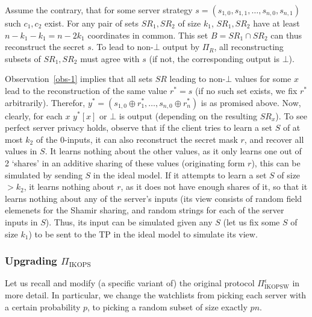 \documentclass[a4paper]{article}
\begin{document}
Assume the contrary, that for some server strategy $s=(s_{1,0},s_{1,1},\ldots,s_{n,0},s_{n,1})$ such $c_1,c_2$ exist.
For any pair of sets $SR_1,SR_2$ of size $k_1$, $SR_1,SR_2$ have at least $n-k_1-k_1=n-2k_1$ coordinates in common. This set $B=SR_1\cap SR_2$ can thus reconstruct the secret $s$. To lead to non-$\bot$ output by $\Pi_R$, all reconstructing subsets of $SR_1,SR_2$ must agree with $s$ (if not, the corresponding output is $\bot$).


Observation~\ref{obs-1} implies that all sets $SR$ leading to non-$\bot$ values for some $x$ lead to the reconstruction of the same value $r^*=s$ (if no such set exists, we fix $r^*$ arbitrarily). Therefor, $y^*=(s_{1,0}\oplus r^*_1,\ldots,s_{n,0}\oplus r^*_n)$ is as promised above. Now, clearly, for each $x$ $y^*[x]$ or $\bot$ is output (depending on the resulting $SR_x$). To see perfect server privacy holds, observe that if the client tries to learn a set $S$ of at most $k_2$ of the 0-inputs, it can also reconstruct the secret mask $r$, and recover all values in $S$.
It learns nothing about the other values, as it only learns one out of 2 `shares' in an additive sharing of these values (originating form $r$), this can be simulated by sending $S$ in the ideal model.
If it attempts to learn a set $S$ of size $>k_2$, it learns nothing about $r$, as it does not have enough shares of it, so that it learns nothing about any of the server's inputs (its view consists of random field elemenets for the Shamir sharing, and random strings for each of the server inputs in $S$). Thus, its input can be simulated given any $S$
(let us fix some $S$ of size $k_1$) to be sent to the TP in the ideal model to simulate its view.

\subsubsection{Upgrading $\Pi_{\text{IKOPS}}$}

Let us recall and modify (a specific variant of) the original protocol $\Pi^{\epsilon}_{\text{IKOPSW}}$ in more detail.
In particular, we change the watchlists from picking each server with
a certain probability $p$, to picking a random subset of size exactly $pn$. 
\end{document}
